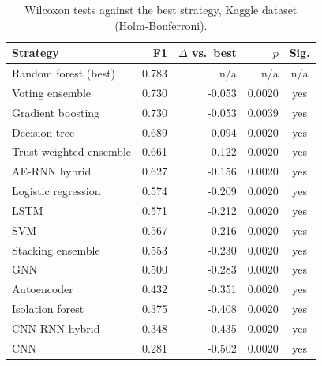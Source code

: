 \begin{table}[H]
\centering
\small
\begin{tabular}{lrrrc}
\toprule
Strategy & F1 & $\Delta$ vs.\ best & $p$ & Sig. \\
\midrule
Random forest (best) & 0.783 & n/a & n/a & n/a \\
\midrule
Voting ensemble & 0.730 & -0.053 & 0.0020 & yes \\
Gradient boosting & 0.730 & -0.053 & 0.0039 & yes \\
Decision tree & 0.689 & -0.094 & 0.0020 & yes \\
Trust-weighted ensemble & 0.661 & -0.122 & 0.0020 & yes \\
AE-RNN hybrid & 0.627 & -0.156 & 0.0020 & yes \\
Logistic regression & 0.574 & -0.209 & 0.0020 & yes \\
LSTM & 0.571 & -0.212 & 0.0020 & yes \\
SVM & 0.567 & -0.216 & 0.0020 & yes \\
Stacking ensemble & 0.553 & -0.230 & 0.0020 & yes \\
GNN & 0.500 & -0.283 & 0.0020 & yes \\
Autoencoder & 0.432 & -0.351 & 0.0020 & yes \\
Isolation forest & 0.375 & -0.408 & 0.0020 & yes \\
CNN-RNN hybrid & 0.348 & -0.435 & 0.0020 & yes \\
CNN & 0.281 & -0.502 & 0.0020 & yes \\
\bottomrule
\end{tabular}
\caption{Wilcoxon tests against the best strategy, Kaggle dataset (Holm-Bonferroni).}
\label{tab:significance-kaggle}
\end{table}

